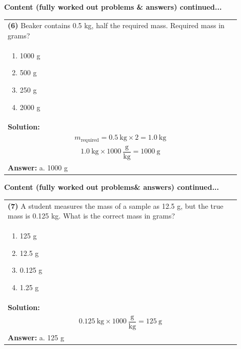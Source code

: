 \documentclass{article}
\begin{document}
{\newpage
\noindent
{\large\textbf{Content (fully worked out problems \& answers) continued...}}\\[0.2em]
\vspace{0.2cm}
\begin{tabular}{|p{0.9\linewidth}|}
\hline
\vspace{0.2cm}
\textbf{(6)} Beaker contains 0.5 kg, half the required mass. Required mass in grams? \\
\begin{minipage}[t]{0.85\linewidth}
\begin{enumerate}[label=\alph*.]
   \item 1000 g
   \item 500 g
   \item 250 g
   \item 2000 g
\end{enumerate}
\end{minipage}\\
\hline
\vspace{0.2cm}
\textbf{Solution:} \\
\[
m_\text{required} = 0.5~\text{kg} \times 2 = 1.0~\text{kg}
\] \\
\[
1.0~\text{kg} \times 1000~\frac{\text{g}}{\text{kg}} = 1000~\text{g}
\] \\ 
\hline
\vspace{0.2cm}
\textbf{Answer:} a. 1000 g \\
\hline
\end{tabular}

\newpage
\noindent
\newpage
\noindent
{\large\textbf{Content (fully worked out problems& answers) continued...}}\\[0.2em]
\vspace{0.2cm}
\begin{tabular}{|p{0.9\linewidth}|}
\hline
\vspace{0.2cm}
\textbf{(7)} A student measures the mass of a sample as 12.5 g, but the true mass is 0.125 kg. What is the correct mass in grams? \\
\begin{minipage}[t]{0.85\linewidth}
\begin{enumerate}[label=\alph*.]
   \item 125 g
   \item 12.5 g
   \item 0.125 g
   \item 1.25 g
\end{enumerate}
\end{minipage}\\
\hline
\vspace{0.2cm}
\textbf{Solution:} \\
\[
0.125~\text{kg} \times 1000~\frac{\text{g}}{\text{kg}} = 125~\text{g}
\] \\ 
\hline
\vspace{0.2cm}
\textbf{Answer:} a. 125 g \\
\hline
\end{tabular}

}
\end{document}
